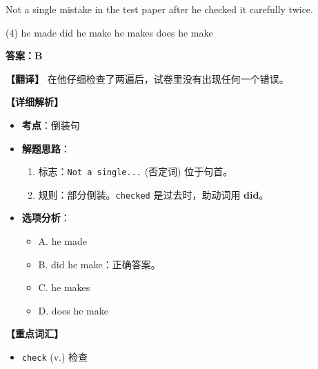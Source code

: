 \documentclass[11pt, a4paper]{article}
\newcommand{\analysis}[4]{
    \begin{solutionbox}
        \textbf{答案：#1}
        
        \textbf{【翻译】} #2
        
        \textbf{【详细解析】}
        #3
        
        \textbf{【重点词汇】}
        #4
    \end{solutionbox}
}
\newcommand{\blank}{\underline{\hspace{1.5cm}}}
\begin{document}
\begin{questions}
    \item Not a single mistake \blank in the test paper after he checked it carefully twice.
    \begin{tasks}(4)
        \task he made \task did he make \task he makes \task does he make
    \end{tasks}
    \analysis{B}{在他仔细检查了两遍后，试卷里没有出现任何一个错误。}{
        \begin{itemize}
            \item \textbf{考点}：倒装句
            \item \textbf{解题思路}：
                \begin{enumerate}
                    \item 标志：\texttt{Not a single...} (否定词) 位于句首。
                    \item 规则：部分倒装。\texttt{checked} 是过去时，助动词用 \textbf{did}。
                \end{enumerate}
            \item \textbf{选项分析}：
                \begin{itemize}
                    \item A. he made
                    \item B. did he make：正确答案。
                    \item C. he makes
                    \item D. does he make
                \end{itemize}
        \end{itemize}
    }{
        \begin{itemize}
            \item \texttt{check} (v.) 检查
        \end{itemize}
    }


\end{questions}
\end{document}
